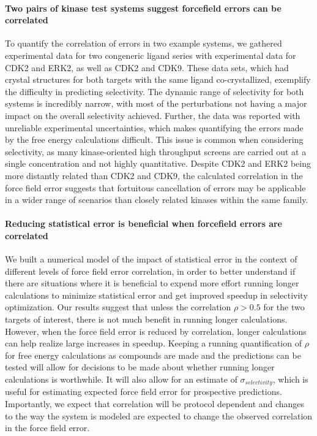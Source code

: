 \documentclass[phd,tocprelim]{cornell}
\begin{document}
\paragraph{Two pairs of kinase test systems suggest forcefield errors can be correlated}
To quantify the correlation of errors in two example systems, we gathered experimental data for two congeneric ligand series with experimental data for CDK2 and ERK2, as well as CDK2 and CDK9. These data sets, which had crystal structures for both targets with the same ligand co-crystallized, exemplify the difficulty in predicting selectivity. 
The dynamic range of selectivity for both systems is incredibly narrow, with most of the perturbations not having a major impact on the overall selectivity achieved. 
Further, the data was reported with unreliable experimental uncertainties, which makes quantifying the errors made by the free energy calculations difficult. 
This issue is common when considering selectivity, as many kinase-oriented high throughput screens are carried out at a single concentration and not highly quantitative. 
Despite CDK2 and ERK2 being more distantly related than CDK2 and CDK9, the calculated correlation in the force field error suggests that fortuitous cancellation of errors may be applicable in a wider range of scenarios than closely related kinases within the same family. 

\paragraph{Reducing statistical error is beneficial when forcefield errors are correlated}

We built a numerical model of the impact of statistical error in the context of different levels of force field error correlation, in order to better understand if there are situations where it is beneficial to expend more effort running longer calculations to minimize statistical error and get improved speedup in selectivity optimization. 
Our results suggest that unless the correlation $\rho > 0.5$ for the two targets of interest, there is not much benefit in running longer calculations. 
However, when the force field error is reduced by correlation, longer calculations can help realize large increases in speedup. Keeping a running quantification of $\rho$ for free energy calculations as compounds are made and the predictions can be tested will allow for decisions to be made about whether running longer calculations is worthwhile. It will also allow for an estimate of $\sigma_{selectivity}$, which is useful for estimating expected force field error for prospective predictions. Importantly, we expect that correlation will be protocol dependent and changes to the way the system is modeled are expected to change the observed correlation in the force field error. 
\end{document}
